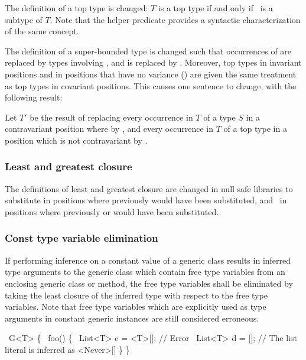 \documentclass[makeidx]{article}
\begin{document}
The definition of a top type is changed: $T$ is a top type if and only if
\ is a subtype of $T$. Note that the helper predicate \IsTopTypeName{}
provides a syntactic characterization of the same concept.

The definition of a super-bounded type is changed such that occurrences of
 are replaced by types involving , and  is replaced by
. Moreover, top types in invariant positions and in positions that
have no variance () are given the
same treatment as top types in covariant positions. This causes one
sentence to change, with the following result:

Let $T'$ be the result of replacing every occurrence in $T$ of a type $S$
in a contravariant position where  by , and every
occurrence in $T$ of a top type in a position which is not contravariant by
.

\subsubsection{Least and greatest closure}

The definitions of least and greatest closure are changed in null safe libraries
to substitute  in positions where previously  would have been
substituted, and \ in positions where previously  or \DYNAMIC{}
would have been substituted.

\subsubsection{Const type variable elimination}
\LMLabel{}

If performing inference on a constant value of a generic class results in
inferred type arguments to the generic class which contain free type variables
from an enclosing generic class or method, the free type variables shall be
eliminated by taking the least closure of the inferred type with respect to the
free type variables.  Note that free type variables which are explicitly used as
type arguments in constant generic instances are still considered erroneous.

\begin{dartCode}
\CLASS\ G<T> \{
  \VOID\ foo() \{
    \CONST\ List<T> c = <T>[]; // Error
    \CONST\ List<T> d = []; // The list literal is inferred as <Never>[]
  \}
\}
\end{dartCode}
\end{document}
